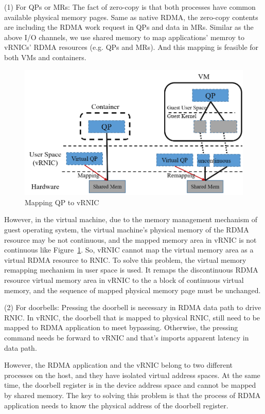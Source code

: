 (1) For QPs or MRs: The fact of zero-copy is that both processes have common available physical memory pages. Same as native RDMA, the zero-copy contents are including the RDMA work request in QPs and data in MRs. 
Similar as the above I/O channels, we use shared memory to map applications' memroy to vRNICs' RDMA resources (e.g. QPs and MRs). And this mapping is feasible for both VMs and containers.

\begin{figure}[!ht]
	\centering
	\includegraphics[width=1.0\linewidth]{images/zero-copy}
	\caption{Mapping QP to vRNIC}
	\label{fig:zero-copy}
\end{figure}

However, in the virtual machine, due to the memory management mechanism of guest operating system, the virtual machine's physical memory of the RDMA resource may be not continuous, and the mapped memory area in vRNIC is not continuous like Figure~\ref{fig:zero-copy}. So, vRNIC cannot map the virtual memory area as a virtual RDMA resource to RNIC. To solve this problem, the virtual memory remapping mechanism in user space is used. It remaps the discontinuous RDMA resource virtual memory area in vRNIC to the a block of continuous virtual memory, and the sequence of mapped physical memory page must be unchanged.

(2) For doorbells: Pressing the doorbell is necessary in RDMA data path to drive RNIC. In vRNIC, the doorbell that is mapped to physical RNIC, still need to be mapped to RDMA application to meet bypassing. Otherwise, the pressing command needs be forward to vRNIC and that’s imports apparent latency in data path.

However, the RDMA application and the vRNIC belong to two different processes on the host, and they have isolated virtual address spaces. At the same time, the doorbell register is in the device address space and cannot be mapped by shared memory. The key to solving this problem is that the process of RDMA application needs to know the physical address of the doorbell register.

